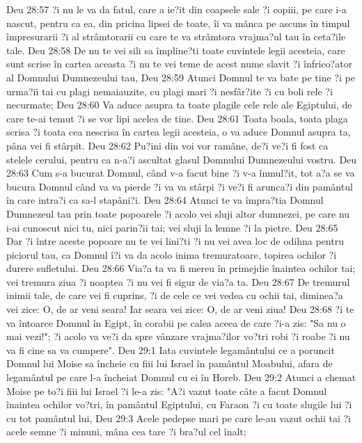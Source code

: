 Deu 28:57  ?i nu le va da fatul, care a ie?it din coapsele sale ?i copiii, pe care i-a nascut, pentru ca ea, din pricina lipsei de toate, îi va mânca pe ascuns în timpul împresurarii ?i al strâmtorarii cu care te va strâmtora vrajma?ul tau în ceta?ile tale.
Deu 28:58  De nu te vei sili sa împline?ti toate cuvintele legii acesteia, care sunt scrise în cartea aceasta ?i nu te vei teme de acest nume slavit ?i înfrico?ator al Domnului Dumnezeului tau,
Deu 28:59  Atunci Domnul te va bate pe tine ?i pe urma?ii tai cu plagi nemaiauzite, cu plagi mari ?i nesfâr?ite ?i cu boli rele ?i necurmate;
Deu 28:60  Va aduce asupra ta toate plagile cele rele ale Egiptului, de care te-ai temut ?i se vor lipi acelea de tine.
Deu 28:61  Toata boala, toata plaga scrisa ?i toata cea nescrisa în cartea legii acesteia, o va aduce Domnul asupra ta, pâna vei fi stârpit.
Deu 28:62  Pu?ini din voi vor ramâne, de?i ve?i fi fost ca stelele cerului, pentru ca n-a?i ascultat glasul Domnului Dumnezeului vostru.
Deu 28:63  Cum s-a bucurat Domnul, când v-a facut bine ?i v-a înmul?it, tot a?a se va bucura Domnul când va va pierde ?i va va stârpi ?i ve?i fi arunca?i din pamântul în care intra?i ca sa-l stapâni?i.
Deu 28:64  Atunci te va împra?tia Domnul Dumnezeul tau prin toate popoarele ?i acolo vei sluji altor dumnezei, pe care nu i-ai cunoscut nici tu, nici parin?ii tai; vei sluji la lemne ?i la pietre.
Deu 28:65  Dar ?i între aceste popoare nu te vei lini?ti ?i nu vei avea loc de odihna pentru piciorul tau, ca Domnul î?i va da acolo inima tremuratoare, topirea ochilor ?i durere sufletului.
Deu 28:66  Via?a ta va fi mereu în primejdie înaintea ochilor tai; vei tremura ziua ?i noaptea ?i nu vei fi sigur de via?a ta.
Deu 28:67  De tremurul inimii tale, de care vei fi cuprins, ?i de cele ce vei vedea cu ochii tai, diminea?a vei zice: O, de ar veni seara! Iar seara vei zice: O, de ar veni ziua!
Deu 28:68  ?i te va întoarce Domnul în Egipt, în corabii pe calea aceea de care ?i-a zis: "Sa nu o mai vezi!"; ?i acolo va ve?i da spre vânzare vrajma?ilor vo?tri robi ?i roabe ?i nu va fi cine sa va cumpere".
Deu 29:1  Iata cuvintele legamântului ce a poruncit Domnul lui Moise sa încheie cu fiii lui Israel în pamântul Moabului, afara de legamântul pe care l-a încheiat Domnul cu ei în Horeb.
Deu 29:2  Atunci a chemat Moise pe to?i fiii lui Israel ?i le-a zis: "A?i vazut toate câte a facut Domnul înaintea ochilor vo?tri, în pamântul Egiptului, cu Faraon ?i cu toate slugile lui ?i cu tot pamântul lui,
Deu 29:3  Acele pedepse mari pe care le-au vazut ochii tai ?i acele semne ?i minuni, mâna cea tare ?i bra?ul cel înalt;
